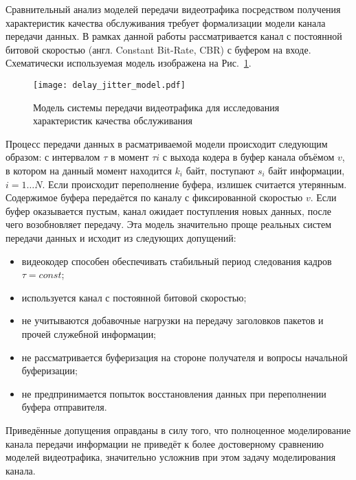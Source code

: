 Сравнительный анализ моделей передачи видеотрафика посредством
получения характеристик качества обслуживания требует формализации
модели канала передачи данных. В рамках данной работы
рассматривается канал с постоянной битовой скоростью (англ.
Constant Bit-Rate, CBR) с буфером на входе. Схематически
используемая модель изображена на Рис.~\ref{fig:delay_jitter_model}.

\begin{figure}[h]
    \begin{center}
        \texttt{[image: delay\_jitter\_model.pdf]}
    \end{center}
    \caption{Модель системы передачи видеотрафика для исследования
    характеристик качества обслуживания}
    \label{fig:delay_jitter_model}
\end{figure}

Процесс передачи данных в расматриваемой модели происходит следующим
образом: с интервалом $\tau$ в момент $\tau i$ с выхода
кодера в буфер канала объёмом $v$, в котором на данный момент
находится $k_i$ байт, поступают $s_i$ байт информации, $i = 1 \dots N$.
Если происходит переполнение буфера, излишек считается утерянным.
Содержимое буфера передаётся по каналу с фиксированной скоростью
$v$. Если буфер оказывается пустым, канал ожидает поступления
новых данных, после чего возобновляет передачу.
Эта модель значительно проще реальных систем передачи данных
и исходит из следующих допущений:

\begin{itemize}
    \item видеокодер способен обеспечивать стабильный период следования кадров $\tau = const$;
    \item используется канал с постоянной битовой скоростью;
    \item не учитываются добавочные нагрузки на передачу заголовков пакетов
        и прочей служебной информации;
    \item не рассматривается буферизация на стороне получателя и вопросы начальной буферизации;
    \item не предпринимается попыток восстановления данных при переполнении
        буфера отправителя.
\end{itemize}

Приведённые допущения оправданы в силу того, что полноценное моделирование
канала передачи информации не приведёт к более достоверному сравнению
моделей видеотрафика, значительно усложнив при этом задачу моделирования канала.


